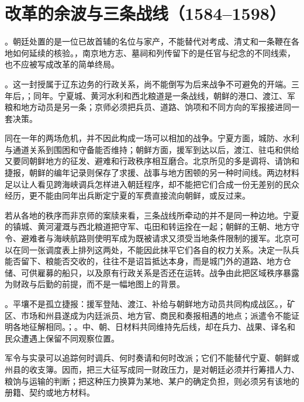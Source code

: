 \section{改革的余波与三条战线（1584--1598）}

。朝廷处置的是一位已故首辅的名位与家产，不能替代对考成、清丈和一条鞭在各地如何延续的核验。，南京地方志、墓祠和列传留下的是任官与纪念的不同线索，也不应被写成改革的简单终局。

。这一封授属于辽东边务的行政关系，尚不能倒写为后来战争不可避免的开端。三年后，；同年。宁夏城、黄河水利和西北粮道是一条战线，朝鲜的港口、渡江、军粮和地方动员是另一条；京师必须把兵员、道路、饷项和不同方向的军报接进同一套决策。

同在一年的两场危机，并不因此构成一场可以相加的战争。宁夏方面，城防、水利与通道关系到围困和守备能否维持；朝鲜方面，援军到达以后，渡江、驻屯和供给又要同朝鲜地方的征发、避难和行政秩序相互磨合。北京所见的多是调将、请饷和捷报，朝鲜的编年记录则保存了求援、战事与地方困顿的另一种时间线。两边材料足以让人看见跨海峡调兵怎样进入朝廷程序，却不能把它们合成一份无差别的民众经历，更不能由同年出兵断定宁夏的军费直接流向朝鲜，或反过来。

若从各地的秩序而非京师的案牍来看，三条战线所牵动的并不是同一种边地。宁夏的镇城、黄河灌溉与西北粮道把守军、屯田和转运拴在一起；朝鲜的王朝、地方守令、避难者与海峡航路则使明军成为既被请求又须受当地条件限制的援军。北京可以在同一张调度表上排列这两处，不能因此抹平它们各自的权力关系。决定一队兵能否留下、粮能否交收的，往往不是诏旨抵达本身，而是城门外的道路、地方仓储、可供雇募的船只，以及原有行政关系是否还在运转。战争由此把区域秩序暴露为财政与后勤的前提，而不是一幅地图上的背景。

。平壤不是孤立捷报：援军登陆、渡江、补给与朝鲜地方动员共同构成战区。，矿区、市场和州县遂成为内廷派员、地方官、商民和奏报相遇的地点；派遣令不能证明各地征解相同。；。中、朝、日材料共同维持先后线，却在兵力、战果、译名和民众遭遇上保留不同观察位置。

\begin{sourcenote}[三条战线如何进入同一财政问题]
军令与实录可以追踪何时调兵、何时奏请和何时改派；它们不能替代宁夏、朝鲜或州县的收支簿。因而，把三大征写成同一财政压力，是对朝廷必须并行筹措人力、粮饷与运输的判断；把这种压力换算为某地、某户的确定负担，则必须另有该地的册籍、契约或地方材料。
\end{sourcenote}

